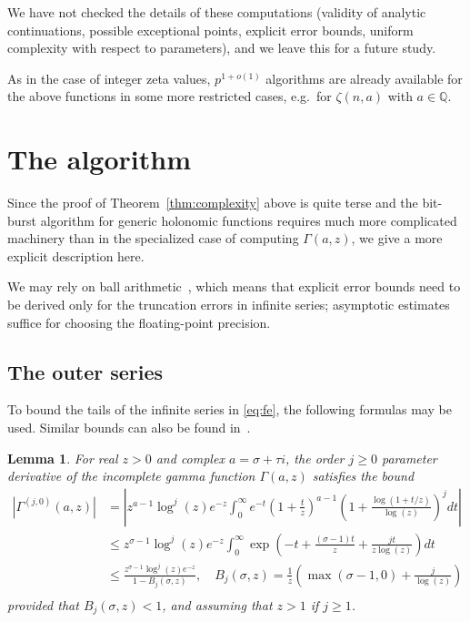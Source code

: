 \documentclass[reqno]{amsart}
\newcommand{\QQ}{\mathbb{Q}}
\newcommand{\be}{\begin{equation}}
\newcommand{\ee}{\end{equation}}
\newtheorem{lemma}[theorem]{Lemma}
\theoremstyle{definition}
\begin{document}
We have not checked the details of these computations
(validity of analytic continuations, possible exceptional points,
explicit error bounds, uniform complexity with respect to parameters),
and we leave this for a future study.

As in the case of integer zeta values,
$p^{1+o(1)}$ algorithms are already available
for the above functions in some more restricted cases,
e.g.\ for $\zeta(n,a)$ with $a \in \QQ$.

\section{The algorithm}

\label{sect:algorithm}

Since the proof of Theorem~\ref{thm:complexity} above is quite terse
and the bit-burst algorithm 
for generic holonomic functions
requires much more complicated machinery
than in the specialized case of computing $\Gamma(a,z)$,
we give a more explicit description here.

We may rely on ball arithmetic~\cite{vdH:ball,Joh2017},
which means that explicit error bounds need to be derived
only for the truncation errors in infinite series;
asymptotic estimates suffice for choosing the floating-point precision.

\subsection{The outer series}

To bound the tails of the infinite series in \eqref{eq:fe},
the following formulas may be used.
Similar bounds can also be found in~\cite{rubinstein1998evidence}.

\begin{lemma}
For real $z > 0$ and complex $a = \sigma + \tau i$,
the order $j \ge 0$ parameter derivative of the incomplete gamma function $\Gamma(a,z)$ satisfies the bound
\be
\begin{aligned}
\label{eq:incgambound}
\left|\Gamma^{(j,0)}(a,z)\right|
&= \left|z^{a-1} \log^j(z) e^{-z} \int_0^{\infty} e^{-t} \left(1+\frac{t}{z}\right)^{a-1} \left(1+\frac{\log(1+t/z)}{\log(z)} \right)^j dt \right| \\
&\le z^{\sigma-1} \log^j(z) e^{-z} \int_0^{\infty} \exp\left(-t + \frac{(\sigma-1) t}{z} + \frac{j t}{z \log(z)}\right) dt \\
&\le \frac{z^{\sigma-1} \log^j(z) e^{-z}}{1-B_j(\sigma,z)}, \quad  B_j(\sigma,z) = \frac{1}{z}\left(\max(\sigma-1, 0) + \frac{j}{\log(z)}\right) \\
\end{aligned}
\ee
provided that $B_j(\sigma,z) < 1$, and assuming that $z > 1$ if $j \ge 1$.
\end{lemma}
\end{document}
